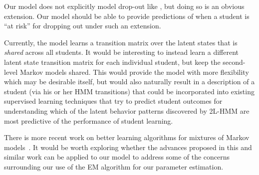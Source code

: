 Our model does not explicitly model drop-out like
\citet{Kizilcec:2013:LAK}, but doing so is an obvious extension. Our model
should be able to provide predictions of when a student is ``at risk'' for
dropping out under such an extension.

Currently, the model learns a transition matrix over the latent states that
is \emph{shared} across all students. It would be interesting to instead
learn a different latent state transition matrix for each individual
student, but keep the second-level Markov models shared. This would provide
the model with more flexibility which may be desirable itself, but would
also naturally result in a description of a student (via his or her HMM
transitions) that could be incorporated into existing supervised learning
techniques that try to predict student outcomes for understanding
which of the latent behavior patterns discovered by 2L-HMM are most predictive
of the performance of student learning. 

There is more recent work on better learning algorithms for mixtures of
Markov models~\citep{Gupta:2016:NIPS}. It would be worth exploring whether
the advances proposed in this and similar work can be applied to our model
to address some of the concerns surrounding our use of the EM algorithm for
our parameter estimation.
